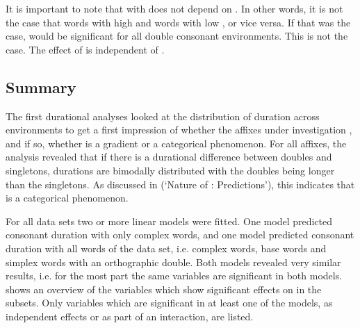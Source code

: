 It is important to note that  with  does not depend on . In other words, it is not the case that words with high   and words with low  , or vice versa. If that was the case,  would be significant for all double consonant environments. This is not the case. The effect of  is independent of . 


\subsection{Summary} \label{discussion experiment}

The first durational analyses looked at the distribution of duration across environments to get a first impression of whether the affixes under investigation , and if so, whether  is a gradient or a categorical phenomenon. 
For all affixes,  the analysis revealed that if there is a durational difference between doubles and singletons, durations are bimodally distributed with the doubles being longer than the singletons. As discussed in  (`Nature of : Predictions'), this indicates that  is a categorical phenomenon.

For all data sets two or more linear models were fitted. One model predicted consonant duration with only complex words, and one model predicted consonant duration with all words of the data set, i.e. complex words, base words and simplex words with an orthographic double. 
Both models revealed very similar results, i.e. for the most part the same variables are significant in both models.
 shows an overview of the variables which show significant effects on  in the subsets. Only variables which are significant in at least one of the models, as independent effects or as part of an interaction, are listed. 




